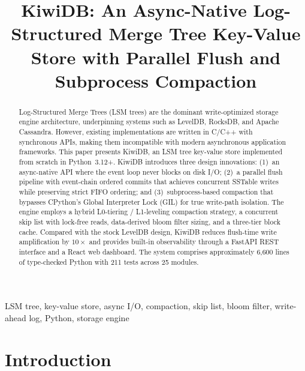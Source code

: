 \documentclass[conference]{IEEEtran}
\begin{document}
\title{KiwiDB: An Async-Native Log-Structured Merge Tree Key-Value Store with Parallel Flush and Subprocess Compaction}

\author{
}

\maketitle

\begin{abstract}
Log-Structured Merge Trees (LSM trees) are the dominant write-optimized storage engine architecture, underpinning systems such as LevelDB, RocksDB, and Apache Cassandra. However, existing implementations are written in C/C++ with synchronous APIs, making them incompatible with modern asynchronous application frameworks. This paper presents KiwiDB, an LSM tree key-value store implemented from scratch in Python~3.12+. KiwiDB introduces three design innovations: (1)~an async-native API where the event loop never blocks on disk I/O; (2)~a parallel flush pipeline with event-chain ordered commits that achieves concurrent SSTable writes while preserving strict FIFO ordering; and (3)~subprocess-based compaction that bypasses CPython's Global Interpreter Lock (GIL) for true write-path isolation. The engine employs a hybrid L0-tiering / L1-leveling compaction strategy, a concurrent skip list with lock-free reads, data-derived bloom filter sizing, and a three-tier block cache. Compared with the stock LevelDB design, KiwiDB reduces flush-time write amplification by $10\times$ and provides built-in observability through a FastAPI REST interface and a React web dashboard. The system comprises approximately 6,600 lines of type-checked Python with 211 tests across 25 modules.
\end{abstract}

\begin{IEEEkeywords}
LSM tree, key-value store, async I/O, compaction, skip list, bloom filter, write-ahead log, Python, storage engine
\end{IEEEkeywords}

\section{Introduction}
\end{document}
